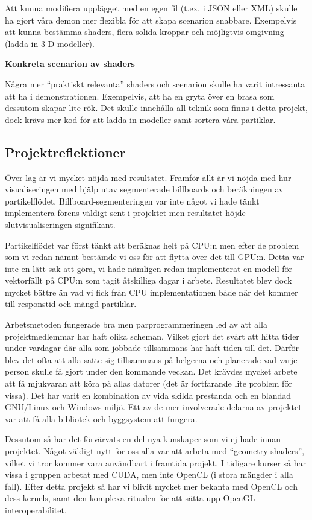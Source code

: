 \documentclass[a4paper]{article}
\begin{document}
\begin{multicols}{2}
            Att kunna modifiera upplägget med en egen fil (t.ex. i JSON eller XML) skulle ha gjort våra demon mer flexibla för att skapa scenarion snabbare. Exempelvis att kunna bestämma shaders, flera solida kroppar och möjligtvis omgivning (ladda in 3-D modeller).

            \textbf{Konkreta scenarion av shaders}

            Några mer ``praktiskt relevanta'' shaders och scenarion skulle ha varit intressanta att ha i demonstrationen. Exempelvis, att ha en gryta över en brasa som dessutom skapar lite rök. Det skulle innehålla all teknik som finns i detta projekt, dock krävs mer kod för att ladda in modeller samt sortera våra partiklar.

        \subsection{Projektreflektioner}

            Över lag är vi mycket nöjda med resultatet. Framför allt är vi nöjda med hur visualiseringen med hjälp utav segmenterade billboards och beräkningen av partikelflödet. Billboard-segmenteringen var inte något vi hade tänkt implementera förens väldigt sent i projektet men resultatet höjde slutvisualiseringen signifikant. 

            Partikelflödet var först tänkt att beräknas helt på CPU:n men efter de problem som vi redan nämnt bestämde vi oss för att flytta över det till GPU:n. Detta var inte en lätt sak att göra, vi hade nämligen redan implementerat en modell för vektorfällt på CPU:n som tagit åtskilliga dagar i arbete. Resultatet blev dock mycket bättre än vad vi fick från CPU implementationen både när det kommer till responstid och mängd partiklar.
            
            Arbetsmetoden fungerade bra men parprogrammeringen led av att alla projektmedlemmar har haft olika scheman. Vilket gjort det svårt att hitta tider under vardagar där alla som jobbade tillsammans har haft tiden till det. Därför blev det ofta att alla satte sig tillsammans på helgerna och planerade vad varje person skulle få gjort under den kommande veckan. Det krävdes mycket arbete att få mjukvaran att köra på allas datorer (det är fortfarande lite problem för vissa). Det har varit en kombination av vida skilda prestanda och en blandad GNU/Linux och Windows miljö. Ett av de mer involverade delarna av projektet var att få alla bibliotek och byggsystem att fungera.

            Dessutom så har det förvärvats en del nya kunskaper som vi ej hade innan projektet. Något väldigt nytt för oss alla var att arbeta med ``geometry shaders'', vilket vi tror kommer vara användbart i framtida projekt. I tidigare kurser så har vissa i gruppen arbetat med CUDA, men inte OpenCL (i stora mängder i alla fall). Efter detta projekt så har vi blivit mycket mer bekanta med OpenCL och dess kernels, samt den komplexa ritualen för att sätta upp OpenGL interoperabilitet. 



    \nocite{*} %
    
    
\end{multicols}
\end{document}
